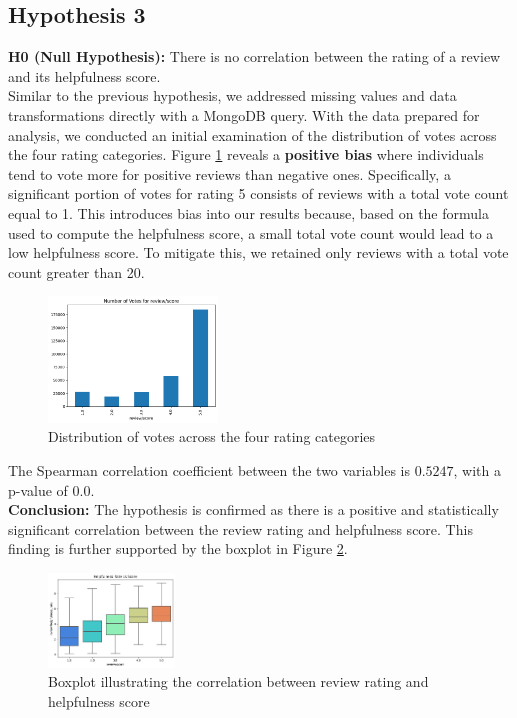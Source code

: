 \subsection*{Hypothesis 3}

\textbf{H0 (Null Hypothesis):} There is no correlation between the rating of a review and its helpfulness score.\\
\noindent
Similar to the previous hypothesis, we addressed missing values and data transformations directly with a MongoDB query.
With the data prepared for analysis, we conducted an initial examination of the distribution of votes across the four rating
categories. Figure \ref{fig:h3_votes_distribution} reveals a \textbf{positive bias} where individuals tend to vote more for
positive reviews than negative ones. Specifically, a significant portion of votes for rating 5 consists of reviews with a
total vote count equal to 1. This introduces bias into our results because, based on the formula used to compute the
helpfulness score, a small total vote count would lead to a low helpfulness score. To mitigate this, we retained only
reviews with a total vote count greater than 20.

\begin{figure}[H]
    \centering
    \includegraphics[width=0.4\textwidth]{./figures/h3_votes_distribution.png}
    \caption{Distribution of votes across the four rating categories}
    \label{fig:h3_votes_distribution}
\end{figure}

\noindent
The Spearman correlation coefficient between the two variables is $0.5247$, with a p-value of $0.0$.\\
\textbf{Conclusion:}
The hypothesis is confirmed as there is a positive and statistically significant correlation between the review rating
and helpfulness score. This finding is further supported by the boxplot in Figure \ref{fig:h3_boxplot}.

\begin{figure}[H]
    \centering
    \includegraphics[width=0.3\textwidth]{./figures/h3_boxplot.png}
    \caption{Boxplot illustrating the correlation between review rating and helpfulness score}
    \label{fig:h3_boxplot}
\end{figure}
